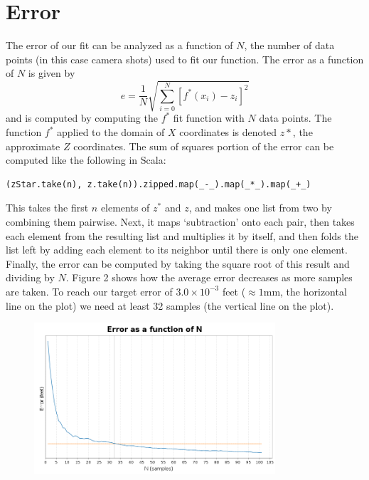 \documentclass[12pt]{article}
\begin{document}
\section*{Error}
The error of our fit can be analyzed as a function of $N$, the number of data
points (in this case camera shots) used to fit our function. The error as a
function of $N$ is given by
\begin{equation*}
  e = \frac{1}{N} \sqrt{\sum_{i = 0}^{N} [f^{*}(x_i) - z_i ]^2 }
\end{equation*}
and is computed by computing the $f^{*}$ fit function with $N$ data points. The
function $f^{*}$ applied to the domain of $X$ coordinates is denoted $z*$, the
approximate $Z$ coordinates. The sum of squares portion of the error can be
computed like the following in Scala: 
\begin{verbatim} 
(zStar.take(n), z.take(n)).zipped.map(_-_).map(_*_).map(_+_)
\end{verbatim}
This takes the first $n$ elements of $z^{*}$ and $z$, and makes one list from
two by combining them pairwise. Next, it maps `subtraction' onto each pair, then
takes each element from the resulting list and multiplies it by itself, and then
folds the list left by adding each element to its neighbor until there is only
one element.  Finally, the error can be computed by taking the square root of
this result and dividing by $N$. Figure 2 shows how the average error decreases
as more samples are taken. To reach our target error of $3.0 \times 10^{-3}$
feet ($\approx 1$mm, the horizontal line on the plot) we need at least 32
samples (the vertical line on the plot).
\begin{figure}[p]
  \centering
  \includegraphics[width=0.8\textwidth]{error.png}
  \caption{}
\end{figure}\\

\newpage

\end{document}
